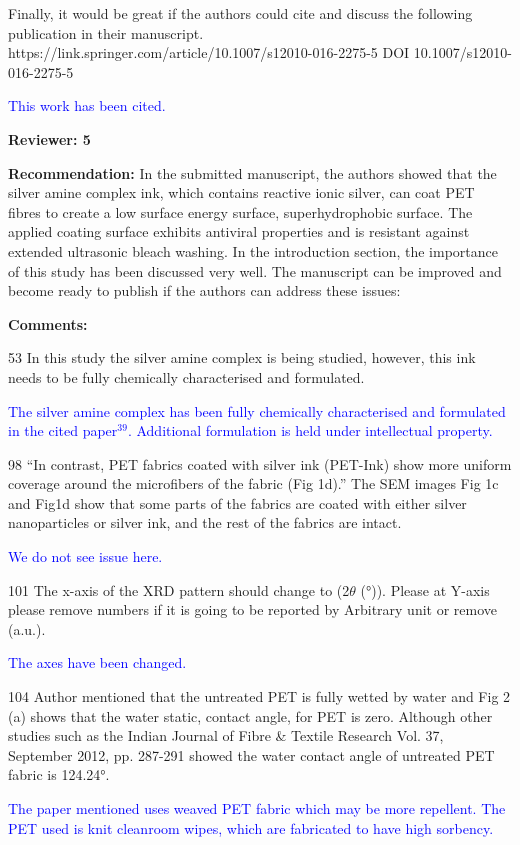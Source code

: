 \documentclass[12pt]{letter}
\newcommand{\blue}[1]{\textcolor{blue}{#1}} %
\begin{document}
Finally, it would be great if the authors could cite and discuss the following publication in their manuscript. https://link.springer.com/article/10.1007/s12010-016-2275-5
DOI 10.1007/s12010-016-2275-5

\blue{This work has been cited. }

\newpage
\textbf{Reviewer: 5}

\textbf{Recommendation:}
In the submitted manuscript, the authors showed that the silver amine complex ink, which contains reactive ionic silver, can coat PET fibres to create a low surface energy surface, superhydrophobic surface. The applied coating surface exhibits antiviral properties and is resistant against extended ultrasonic bleach washing. In the introduction section, the importance of this study has been discussed very well. The manuscript can be improved and become ready to publish if the authors can address these issues:

\textbf{Comments:} 

53 In this study the silver amine complex is being studied, however, this ink needs to be fully chemically characterised and formulated.

\blue{The silver amine complex has been fully chemically characterised and formulated in the cited paper$^{39}$. Additional formulation is held under intellectual property.}

98 “In contrast, PET fabrics coated with silver ink (PET-Ink) show more uniform coverage around the microfibers of the fabric (Fig 1d).”
The SEM images Fig 1c and Fig1d show that some parts of the fabrics are coated with either silver nanoparticles or silver ink, and the rest of the fabrics are intact.

\blue{We do not see issue here. }

101 The x-axis of the XRD pattern should change to (2$\theta$ (°)). Please at Y-axis please remove numbers if it is going to be reported by Arbitrary unit or remove (a.u.).

\blue{The axes have been changed. }

104 Author mentioned that the untreated PET is fully wetted by water and Fig 2 (a) shows that the water static, contact angle, for PET is zero. Although other studies such as the Indian Journal of Fibre & Textile Research Vol. 37, September 2012, pp. 287-291 showed the water contact angle of untreated PET fabric is 124.24°.

\blue{The paper mentioned uses weaved PET fabric which may be more repellent. The PET used is knit cleanroom wipes, which are fabricated to have high sorbency. }
\end{document}
